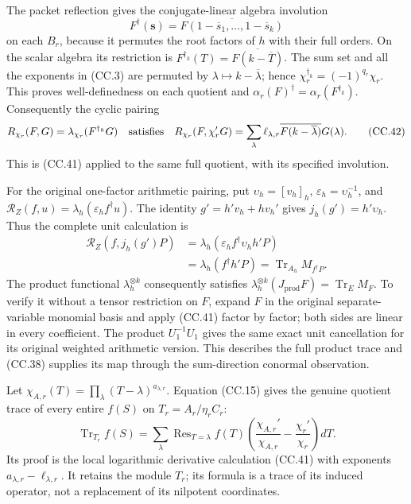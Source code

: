 The packet reflection gives the conjugate-linear algebra involution
\[
 F^\dagger(\mathbf s)=\overline{F(1-\overline s_1,\ldots,
 1-\overline s_k)}
\]
on each \(B_r\), because it permutes the
root factors of \(h\) with their full orders.  On the scalar
algebra its restriction is
\(F^{\dagger_k}(T)=\overline{F(k-\overline T)}\).
The sum set and all the exponents in (CC.3) are permuted by
\(\lambda\mapsto k-\overline\lambda\); hence
\(\chi_r^{\dagger_k}=(-1)^{q_r}\chi_r\).
This proves well-definedness on each quotient and
\(\alpha_r(F)^{\dagger}=\alpha_r(F^{\dagger_k})\).
Consequently the cyclic pairing
\[
 R_{\chi_r}(F,G)=\lambda_{\chi_r}(F^{\dagger_k}G)
 \quad\hbox{satisfies}\quad
 R_{\chi_r}(F,\chi_r'G)
   =\sum_\lambda\ell_{\lambda,r}
      \overline{F(k-\overline\lambda)}G(\lambda).
 \tag{CC.42}
\]
This is (CC.41) applied to the same full quotient, with its
specified involution.

For the original one-factor arithmetic pairing, put
\(\upsilon_h=[v_h]_h\), \(\varepsilon_h=\upsilon_h^{-1}\), and
\(\mathscr R_Z(f,u)=\lambda_h(\varepsilon_h f^\dagger u)\).
The identity \(g'=h'v_h+hv_h'\) gives
\(j_h(g')=h'\upsilon_h\).  Thus the complete unit calculation is
\[
 \begin{aligned}
 \mathscr R_Z(f,j_h(g')P)
 &=\lambda_h(\varepsilon_h f^\dagger\upsilon_h h'P)\\
 &=\lambda_h(f^\dagger h'P)
  =\operatorname{Tr}_{A_h}M_{f^\dagger P}.
 \end{aligned}\tag{CC.43}
\]
The product functional \(\lambda_h^{\otimes k}\) consequently
satisfies
\(\lambda_h^{\otimes k}(J_{\mathrm{prod}}F)
=\operatorname{Tr}_{E}M_F\).
To verify it without a tensor restriction on \(F\), expand \(F\)
in the original separate-variable monomial basis and apply (CC.41)
factor by factor; both sides are linear in every coefficient.
The product \(U_1^{-1}U_1\) gives the same exact unit cancellation
for its original weighted arithmetic version.  This describes the
full product trace and (CC.38) supplies its map through the
sum-direction conormal observation.

Let \(\chi_{A,r}(T)=\prod_\lambda(T-\lambda)^{a_{\lambda,r}}\).
Equation (CC.15) gives the genuine quotient trace of every entire
\(f(S)\) on \(T_r=A_r/\eta_rC_r\):
\[
 \operatorname{Tr}_{T_r}f(S)
  =\sum_\lambda\operatorname{Res}_{T=\lambda}f(T)
       \left(\frac{\chi_{A,r}'}{\chi_{A,r}}
                    -\frac{\chi_r'}{\chi_r}\right)dT.
 \tag{CC.44}
\]
Its proof is the local logarithmic derivative calculation (CC.41)
with exponents \(a_{\lambda,r}-\ell_{\lambda,r}\).
It retains the module \(T_r\); its formula is a trace of its
induced operator, not a replacement of its nilpotent coordinates.

